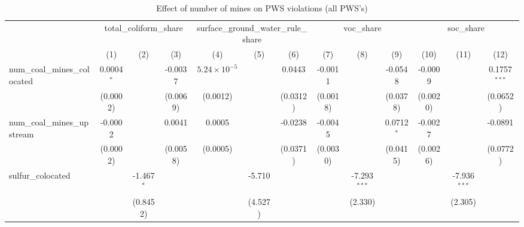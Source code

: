 
\begin{table}[htbp]
   \caption{\label{olsrf2sls_nummine_non_mine_vio_1985to2005allhucs} Effect of number of mines on PWS violations (all PWS's)}
   \bigskip
   \centering
   \begin{adjustbox}{width = \textwidth, center}
      \begin{tabular}{lcccccccccccc}
         \toprule
          & \multicolumn{3}{c}{total\_coliform\_share} & \multicolumn{3}{c}{surface\_ground\_water\_rule\_share} & \multicolumn{3}{c}{voc\_share} & \multicolumn{3}{c}{soc\_share}\\
                                                            & (1)           & (2)                   & (3)                   & (4)                   & (5)           & (6)           & (7)           & (8)            & (9)           & (10)          & (11)            & (12)\\  
         \midrule 
         num\_coal\_mines\_colocated                        & 0.0004$^{*}$  &                       & -0.0037               & $5.24\times 10^{-5}$  &               & 0.0443        & -0.0011       &                & -0.0548       & -0.0009       &                 & 0.1757$^{***}$\\   
                                                            & (0.0002)      &                       & (0.0069)              & (0.0012)              &               & (0.0312)      & (0.0018)      &                & (0.0378)      & (0.0020)      &                 & (0.0652)\\   
         num\_coal\_mines\_upstream                         & -0.0002       &                       & 0.0041                & 0.0005                &               & -0.0238       & -0.0045       &                & 0.0712$^{*}$  & -0.0027       &                 & -0.0891\\   
                                                            & (0.0002)      &                       & (0.0058)              & (0.0005)              &               & (0.0371)      & (0.0030)      &                & (0.0415)      & (0.0026)      &                 & (0.0772)\\   
         sulfur\_colocated                                  &               & -1.467$^{*}$          &                       &                       & -5.710        &               &               & -7.293$^{***}$ &               &               & -7.936$^{***}$  &   \\   
                                                            &               & (0.8452)              &                       &                       & (4.527)       &               &               & (2.330)        &               &               & (2.305)         &   \\   

\end{tabular}
\end{adjustbox}
\end{table}
